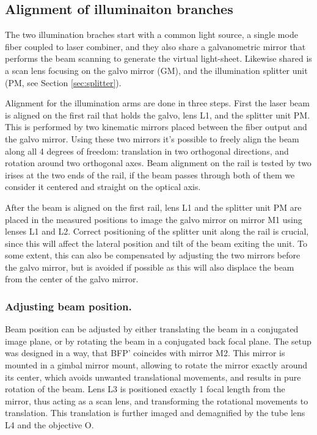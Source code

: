   \subsection{Alignment of illuminaiton branches}

    The two illumination braches start with a common light source, a single mode fiber coupled to laser combiner, and they also share a galvanometric mirror that performs the beam scanning to generate the virtual light-sheet. Likewise shared is a scan lens focusing on the galvo mirror (GM), and the illumination splitter unit (PM, see Section \ref{sec:splitter}).

    Alignment for the illumination arms are done in three steps. First the laser beam is aligned on the first rail that holds the galvo, lens L1, and the splitter unit PM. This is performed by two kinematic mirrors placed between the fiber output and the galvo mirror. Using these two mirrors it's possible to freely align the beam along all 4 degrees of freedom: translation in two orthogonal directions, and rotation around two orthogonal axes. Beam alignment on the rail is tested by two irises at the two ends of the rail, if the beam passes through both of them we consider it centered and straight on the optical axis.

    After the beam is aligned on the first rail, lens L1 and the splitter unit PM are placed in the measured positions to image the galvo mirror on mirror M1 using lenses L1 and L2. Correct positioning of the splitter unit along the rail is crucial, since this will affect the lateral position and tilt of the beam exiting the unit. To some extent, this can also be compensated by adjusting the two mirrors before the galvo mirror, but is avoided if possible as this will also displace the beam from the center of the galvo mirror.

    \subsubsection{Adjusting beam position.}
      Beam position can be adjusted by either translating the beam in a conjugated image plane, or by rotating the beam in a conjugated back focal plane. The setup was designed in a way, that BFP' coincides with mirror M2. This mirror is mounted in a gimbal mirror mount, allowing to rotate the mirror exactly around its center, which avoids unwanted translational movements, and results in pure rotation of the beam. Lens L3 is positioned exactly 1 focal length from the mirror, thus acting as a scan lens, and transforming the rotational movements to translation. This translation is further imaged and demagnified by the tube lens L4 and the objective O.


